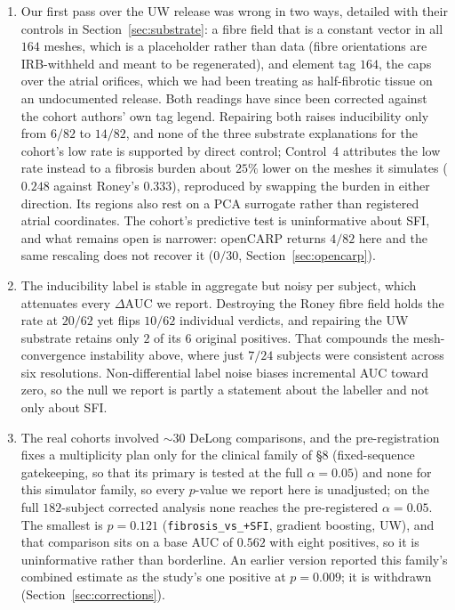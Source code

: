 \documentclass[11pt]{article}
\theoremstyle{definition}
\newcommand{\dAUC}{\Delta\mathrm{AUC}}
\newcommand{\code}[1]{\texttt{#1}}
\begin{document}
\begin{enumerate}[leftmargin=1.5em]
\item Our first pass over the UW release was wrong in two ways, detailed with their
controls in Section~\ref{sec:substrate}: a fibre field that is a constant vector
in all $164$ meshes, which is a placeholder rather than data (fibre orientations
are IRB-withheld and meant to be regenerated), and element tag $164$, the caps
over the atrial orifices, which we had been treating as half-fibrotic tissue on
an undocumented release. Both readings have since been
corrected against the cohort authors' own tag legend. Repairing both
raises inducibility only from $6/82$ to $14/82$, and none of the three
substrate explanations for the cohort's low rate is supported by direct
control; Control~4 attributes the low rate instead to a fibrosis burden about
$25\%$ lower on the meshes it simulates
($0.248$ against Roney's $0.333$), reproduced by swapping the burden in either
direction. Its regions also rest on a PCA surrogate rather than
registered atrial coordinates. The cohort's predictive test is uninformative
about SFI, and what remains open is narrower: openCARP returns $4/82$ here and
the same rescaling does not recover it ($0/30$, Section~\ref{sec:opencarp}).
\item The inducibility label is stable in aggregate but noisy per subject, which
attenuates every $\dAUC$ we report. Destroying the Roney fibre field holds the rate
at $20/62$ yet flips $10/62$ individual verdicts, and repairing the UW substrate retains
only $2$ of its $6$ original positives. That compounds the mesh-convergence
instability above, where just $7/24$ subjects were consistent across six
resolutions. Non-differential label noise biases incremental AUC toward zero, so the
null we report is partly a statement about the labeller and not only about SFI.
\item The real cohorts involved $\sim\!30$ DeLong comparisons, and the
pre-registration fixes a multiplicity plan only for the clinical family of
\S8 (fixed-sequence gatekeeping, so that its primary is tested at the full
$\alpha=0.05$) and none for this simulator family, so every $p$-value we
report here is unadjusted; on the full $182$-subject corrected analysis
none reaches the pre-registered $\alpha=0.05$. The smallest is $p=0.121$
(\code{fibrosis\_vs\_+SFI}, gradient boosting, UW), and that comparison sits on a
base AUC of $0.562$ with eight positives, so it is uninformative rather than
borderline. An earlier version reported this family's combined estimate as the
study's one positive at $p=0.009$; it is withdrawn (Section~\ref{sec:corrections}).

\end{enumerate}
\end{document}

